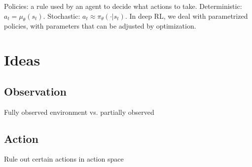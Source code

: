 \documentclass{article}
\begin{document}
    Policies: a rule used by an agent to decide what actions to take. Deterministic: $a_t = \mu_{\theta}(s_t)$. Stochastic: $a_t \approx \pi_{\theta}(\cdot | s_t)$. In deep RL, we deal with parametrized policies, with parameters that can be adjusted by optimization.

\section{Ideas}
    \subsection{Observation}
      Fully observed environment vs. partially observed\
    \subsection{Action}
      Rule out certain actions in action space
\end{document}
